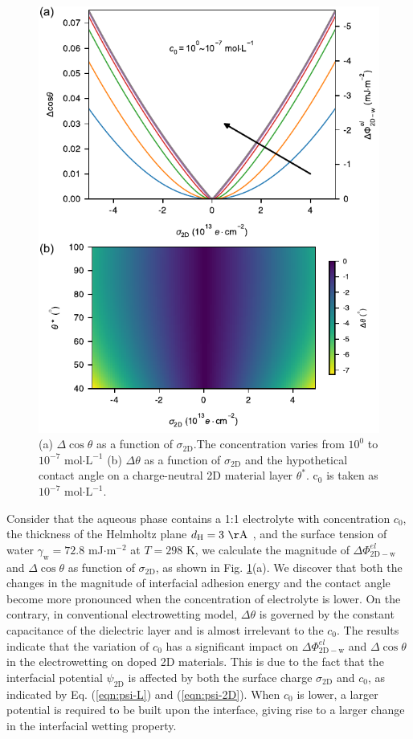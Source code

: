 \documentclass[aps,prl,reprint,groupedaddress,amsmath,amssymb, showpacs]{revtex4-1}
\begin{document}
\begin{figure}[htbp]
\centering
\includegraphics[width=0.85\linewidth]{../img/2d-ph-dependency.pdf}
\caption{\label{fig:Delta-cos-dependency}
(a) \(\Delta\cos\theta\) as a function of \(\sigma_{\mathrm{2D}}\).The concentration varies from \(10^{0}\) to \(10^{-7}\) mol\(\cdot\mathrm{L}^{-1}\) (b) \(\Delta\theta\) as a function of \(\sigma_{\mathrm{2D}}\) and the hypothetical contact angle on a charge-neutral 2D material layer \(\theta^{*}\). c\(_{\text{0}}\) is taken as \(10^{-7}\) mol\(\cdot\mathrm{L}^{-1}\).}
\end{figure}

Consider that the aqueous phase contains a 1:1 electrolyte with
concentration \(c_{0}\), the thickness of the Helmholtz plane
\(d_{\mathrm{H}}=3\ \mathrm{\AA}\) \cite{mcclendon_thickness_1927}, and
the surface tension of water \(\gamma_{\mathrm{w}}=72.8\) mJ\(\cdot
\mathrm{m}^{-2}\) at \(T=298\) K, we calculate the magnitude of
\(\Delta\Phi_{\mathrm{2D-w}}^{el}\) and \(\Delta\cos\theta\) as function
of \(\sigma_{\mathrm{2D}}\), as shown in
Fig. \ref{fig:Delta-cos-dependency}(a). We discover that both the
changes in the magnitude of interfacial adhesion energy and the
contact angle become more pronounced when the concentration of
electrolyte is lower. On the contrary, in conventional electrowetting
model, \(\Delta\theta\) is governed by the constant capacitance of the
dielectric layer and is almost irrelevant to the \(c_{0}\). The results indicate that the variation of \(c_{0}\) has a significant impact on \(\Delta
\Phi_{\mathrm{2D-w}}^{el}\) and \(\Delta \cos \theta\) in the
electrowetting on doped 2D materials. This is due to the fact that the
interfacial potential \(\psi_{\mathrm{2D}}\) is affected by both the
surface charge \(\sigma_{\mathrm{2D}}\) and \(c_{0}\), as indicated by
Eq. (\ref{eqn:psi-L}) and (\ref{eqn:psi-2D}). When \(c_{0}\) is lower, a
larger potential is required to be built upon the interface, giving
rise to a larger change in the interfacial wetting property.
\end{document}
